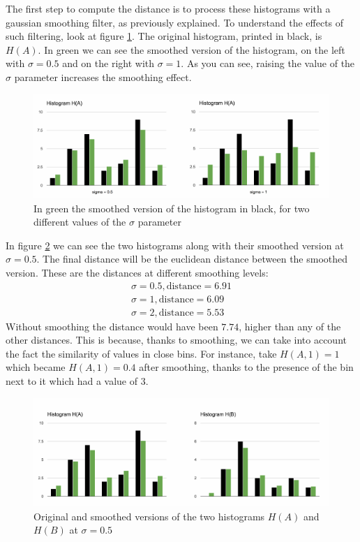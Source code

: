 The first step to compute the distance is to process these histograms with a gaussian smoothing filter, as previously explained. To understand the effects of such filtering, look at figure \ref{fig:sigma_difference}. The original histogram, printed in black, is $H(A)$. In green we can see the smoothed version of the histogram, on the left with $\sigma = 0.5$ and on the right with $\sigma = 1$. As you can see, raising the value of the $\sigma$ parameter increases the smoothing effect.

\begin{figure}[h]
\centering
\includegraphics[width=450]{images/sigma_difference.pdf}
\caption{In green the smoothed version of the histogram in black, for two different values of the $\sigma$ parameter}
\label{fig:sigma_difference}
\end{figure}

In figure \ref{fig:smoothed_a_b} we can see the two histograms along with their smoothed version at $\sigma = 0.5$. The final distance will be the euclidean distance between the smoothed version. These are the distances at different smoothing levels:
\begin{align}
  \sigma = 0.5, \text{distance} = 6.91\nonumber\\
  \sigma = 1, \text{distance} = 6.09\nonumber\\
  \sigma = 2, \text{distance} = 5.53\nonumber
\end{align}
Without smoothing the distance would have been $7.74$, higher than any of the other distances. This is because, thanks to smoothing, we can take into account the fact the similarity of values in close bins. For instance, take $H(A,1) = 1$ which became $H(A,1) = 0.4$ after smoothing, thanks to the presence of the bin next to it which had a value of $3$.

\begin{figure}[h]
\centering
\includegraphics[width=450]{images/smoothed_a_b.pdf}
\caption{Original and smoothed versions of the two histograms $H(A)$ and $H(B)$ at $\sigma = 0.5$}
\label{fig:smoothed_a_b}
\end{figure}

